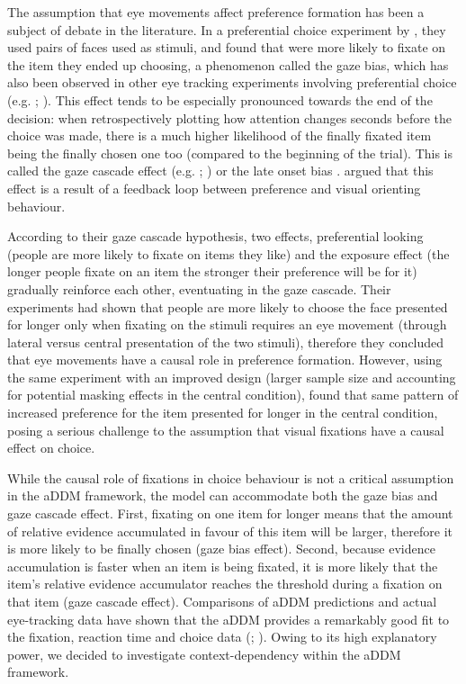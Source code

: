 \documentclass[11pt,a4paper]{article}
\begin{document}
The assumption that eye movements affect preference formation has been a subject of debate in the literature. In a preferential choice experiment by , they used pairs of faces used as stimuli, and found that were more likely to fixate on the item they ended up choosing, a phenomenon called the gaze bias, which has also been observed in other eye tracking experiments involving preferential choice (e.g. ; ). This effect tends to be especially pronounced towards the end of the decision: when retrospectively plotting how attention changes seconds before the choice was made, there is a much higher likelihood of the finally fixated item being the finally chosen one too (compared to the beginning of the trial). This is called the gaze cascade effect (e.g. ; ) or the late onset bias \cite{Mullett2016}.  argued that this effect is a result of a feedback loop between preference and visual orienting behaviour. 

According to their gaze cascade hypothesis, two effects, preferential looking (people are more likely to fixate on items they like) and the exposure effect (the longer people fixate on an item the stronger their preference will be for it) gradually reinforce each other, eventuating in the gaze cascade. Their experiments had shown that people are more likely to choose the face presented for longer only when fixating on the stimuli requires an eye movement (through lateral versus central presentation of the two stimuli), therefore they concluded that eye movements have a causal role in preference formation. However, using the same experiment with an improved design (larger sample size and accounting for potential masking effects in the central condition),  found that same pattern of increased preference for the item presented for longer in the central condition, posing a serious challenge to the assumption that visual fixations have a causal effect on choice.


While the causal role of fixations in choice behaviour is not a critical assumption in the aDDM framework, the model can accommodate both the gaze bias and gaze cascade effect. First, fixating on one item for longer means that the amount of relative evidence accumulated in favour of this item will be larger, therefore it is more likely to be finally chosen (gaze bias effect). Second, because evidence accumulation is faster when an item is being fixated, it is more likely that the item's relative evidence accumulator reaches the threshold during a fixation on that item (gaze cascade effect). Comparisons of aDDM predictions and actual eye-tracking data have shown that the aDDM provides a remarkably good fit to the fixation, reaction time and choice data (; ). Owing to its high explanatory power, we decided to investigate context-dependency within the aDDM framework. 
\end{document}
